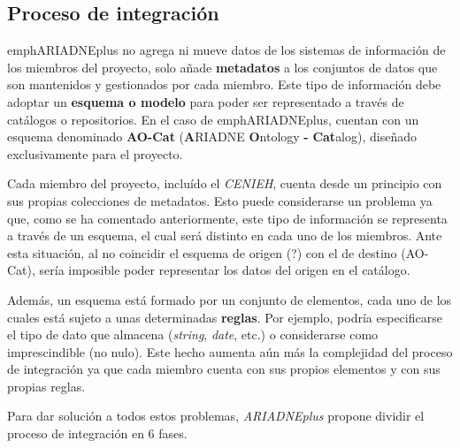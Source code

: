 \subsection{Proceso de integración}

emph{ARIADNEplus} no agrega ni mueve datos de los sistemas de información de
los miembros del proyecto, solo añade \textbf{metadatos} a los conjuntos
de datos que son mantenidos y gestionados por cada miembro. Este tipo de 
información debe adoptar un \textbf{esquema o modelo} para poder ser
representado a través de catálogos o repositorios. En el caso de
emph{ARIADNEplus}, cuentan con un esquema denominado \textbf{AO-Cat}
(\textbf{A}RIADNE \textbf{O}ntology \textbf{-} \textbf{Cat}alog),
diseñado exclusivamente para el proyecto.

Cada miembro del proyecto, incluído el \emph{CENIEH}, cuenta desde un principio
con sus propias colecciones de metadatos. Esto puede considerarse un
problema ya que, como se ha comentado anteriormente, este tipo de
información se representa a través de un esquema, el cual será distinto
en cada uno de los miembros. Ante esta situación, al no coincidir el
esquema de origen (?) con el de destino (AO-Cat), sería imposible poder
representar los datos del origen en el catálogo.


Además, un esquema está formado por un conjunto de elementos, cada uno
de los cuales está sujeto a unas determinadas \textbf{reglas}. Por ejemplo,
podría especificarse el tipo de dato que almacena (\emph{string},
\emph{date}, etc.) o considerarse como imprescindible (no nulo). Este
hecho aumenta aún más la complejidad del proceso de integración ya que
cada miembro cuenta con sus propios elementos y con sus propias reglas.

Para dar solución a todos estos problemas, \emph{ARIADNEplus} propone dividir
el proceso de integración en 6 fases.


